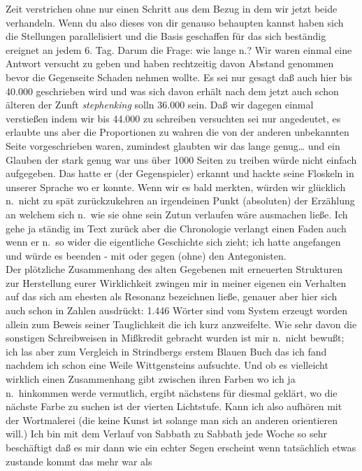 \documentclass[
]{article}
\begin{document}
Zeit verstrichen ohne nur einen Schritt aus dem Bezug in dem wir jetzt
beide verhandeln. Wenn du also dieses von dir genauso behaupten kannst
haben sich die Stellungen parallelisiert und die Basis geschaffen für
das sich beständig ereignet an jedem 6. Tag. Darum die Frage: wie lange
n.? Wir waren einmal eine Antwort versucht zu geben und haben
rechtzeitig davon Abstand genommen bevor die Gegenseite Schaden nehmen
wollte. Es sei nur gesagt daß auch hier bis 40.000 geschrieben wird und
was sich davon erhält nach dem jetzt auch schon älteren der Zunft
\emph{stephenking} solln 36.000 sein. Daß wir dagegen einmal verstießen
indem wir bis 44.000 zu schreiben versuchten sei nur angedeutet, es
erlaubte uns aber die Proportionen zu wahren die von der anderen
unbekannten Seite vorgeschrieben waren, zumindest glaubten wir das lange
genug\ldots{} und ein Glauben der stark genug war uns über 1000 Seiten
zu treiben würde nicht einfach aufgegeben. Das hatte er (der
Gegenspieler) erkannt und hackte seine Floskeln in unserer Sprache wo er
konnte. Wenn wir es bald merkten, würden wir glücklich n.~nicht zu spät
zurückzukehren an irgendeinen Punkt (absoluten) der Erzählung an welchem
sich n.~wie sie ohne sein Zutun verlaufen wäre ausmachen ließe. Ich gehe
ja ständig im Text zurück aber die Chronologie verlangt einen Faden auch
wenn er n.~so wider die eigentliche Geschichte sich zieht; ich hatte
angefangen und würde es beenden - mit oder gegen (ohne) den
Antegonisten.\\
Der plötzliche Zusammenhang des alten Gegebenen mit erneuerten
Strukturen zur Herstellung eurer Wirklichkeit zwingen mir in meiner
eigenen ein Verhalten auf das sich am ehesten als Resonanz bezeichnen
ließe, genauer aber hier sich auch schon in Zahlen ausdrückt: 1.446
Wörter sind vom System erzeugt worden allein zum Beweis seiner
Tauglichkeit die ich kurz anzweifelte. Wie sehr davon die sonstigen
Schreibweisen in Mißkredit gebracht wurden ist mir n.~nicht bewußt; ich
las aber zum Vergleich in Strindbergs erstem Blauen Buch das ich fand
nachdem ich schon eine Weile Wittgensteins aufsuchte. Und ob es
vielleicht wirklich einen Zusammenhang gibt zwischen ihren Farben wo ich
ja n.~hinkommen werde vermutlich, ergibt nächstens für diesmal geklärt,
wo die nächste Farbe zu suchen ist der vierten Lichtstufe. Kann ich also
aufhören mit der Wortmalerei (die keine Kunst ist solange man sich an
anderen orientieren will.) Ich bin mit dem Verlauf von Sabbath zu
Sabbath jede Woche so sehr beschäftigt daß es mir dann wie ein echter
Segen erscheint wenn tatsächlich etwas zustande kommt das mehr war als
\end{document}
